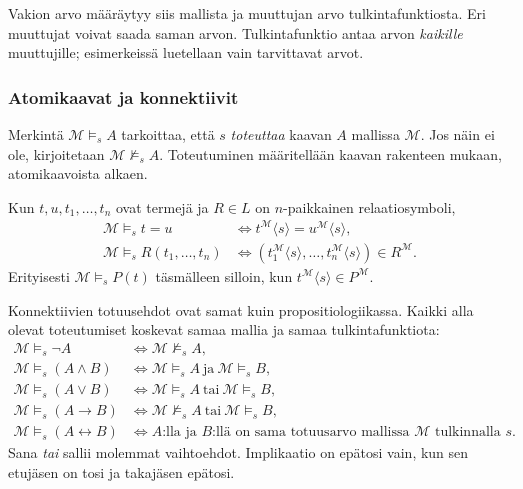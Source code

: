 \documentclass[11pt,a4paper]{amsart}
\begin{document}
Vakion arvo määräytyy siis mallista ja muuttujan arvo tulkintafunktiosta.
Eri muuttujat voivat saada saman arvon. Tulkintafunktio antaa arvon
\emph{kaikille} muuttujille; esimerkeissä luetellaan vain tarvittavat arvot.

\subsubsection{Atomikaavat ja konnektiivit}

Merkintä $\mathcal M\models_s A$ tarkoittaa, että $s$ \emph{toteuttaa}
kaavan $A$ mallissa $\mathcal M$. Jos näin ei ole, kirjoitetaan
$\mathcal M\not\models_s A$. Toteutuminen määritellään kaavan
rakenteen mukaan, atomikaavoista alkaen.

\begin{definition}
  Kun $t,u,t_1,\ldots,t_n$ ovat termejä ja $R\in L$ on
  $n$-paikkainen relaatiosymboli,
  \begin{align*}
    \mathcal M\models_s t=u
    &\iff t^{\mathcal M}\langle s\rangle=u^{\mathcal M}\langle s\rangle,\\
    \mathcal M\models_s R(t_1,\ldots,t_n)
    &\iff (t_1^{\mathcal M}\langle s\rangle,\ldots,
    t_n^{\mathcal M}\langle s\rangle)\in R^{\mathcal M}.
  \end{align*}
  Erityisesti $\mathcal M\models_s P(t)$ täsmälleen silloin, kun
  $t^{\mathcal M}\langle s\rangle\in P^{\mathcal M}$.
\end{definition}

Konnektiivien totuusehdot ovat samat kuin propositiologiikassa.
Kaikki alla olevat toteutumiset koskevat samaa mallia ja samaa
tulkintafunktiota:
\begin{align*}
  \mathcal M\models_s\neg A
  &\iff \mathcal M\not\models_s A,\\
  \mathcal M\models_s(A\land B)
  &\iff \mathcal M\models_s A\ \text{ja}\ \mathcal M\models_s B,\\
  \mathcal M\models_s(A\lor B)
  &\iff \mathcal M\models_s A\ \text{tai}\ \mathcal M\models_s B,\\
  \mathcal M\models_s(A\to B)
  &\iff \mathcal M\not\models_s A\ \text{tai}\ \mathcal M\models_s B,\\
  \mathcal M\models_s(A\leftrightarrow B)
  &\iff A\text{:lla ja }B\text{:llä on sama totuusarvo mallissa }
  \mathcal M\text{ tulkinnalla }s.
\end{align*}
Sana \emph{tai} sallii molemmat vaihtoehdot. Implikaatio on epätosi
vain, kun sen etujäsen on tosi ja takajäsen epätosi.
\end{document}
